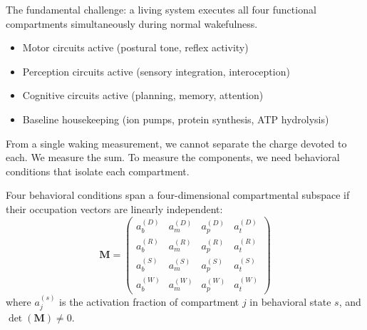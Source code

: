 The fundamental challenge: a living system executes all four functional compartments simultaneously during normal wakefulness.
\begin{itemize}
\item Motor circuits active (postural tone, reflex activity)
\item Perception circuits active (sensory integration, interoception)
\item Cognitive circuits active (planning, memory, attention)
\item Baseline housekeeping (ion pumps, protein synthesis, ATP hydrolysis)
\end{itemize}

From a single waking measurement, we cannot separate the charge devoted to each. We measure the sum. To measure the components, we need behavioral conditions that isolate each compartment.

\begin{theorem}
\label{thm:orthogonal-basis}
Four behavioral conditions span a four-dimensional compartmental subspace if their occupation vectors are linearly independent:
\begin{equation}
\mathbf{M} = \begin{pmatrix}
a_b^{(D)} & a_m^{(D)} & a_p^{(D)} & a_t^{(D)} \\
a_b^{(R)} & a_m^{(R)} & a_p^{(R)} & a_t^{(R)} \\
a_b^{(S)} & a_m^{(S)} & a_p^{(S)} & a_t^{(S)} \\
a_b^{(W)} & a_m^{(W)} & a_p^{(W)} & a_t^{(W)}
\end{pmatrix}
\end{equation}
where $a_j^{(s)}$ is the activation fraction of compartment $j$ in behavioral state $s$, and $\det(\mathbf{M}) \neq 0$.
\end{theorem}

